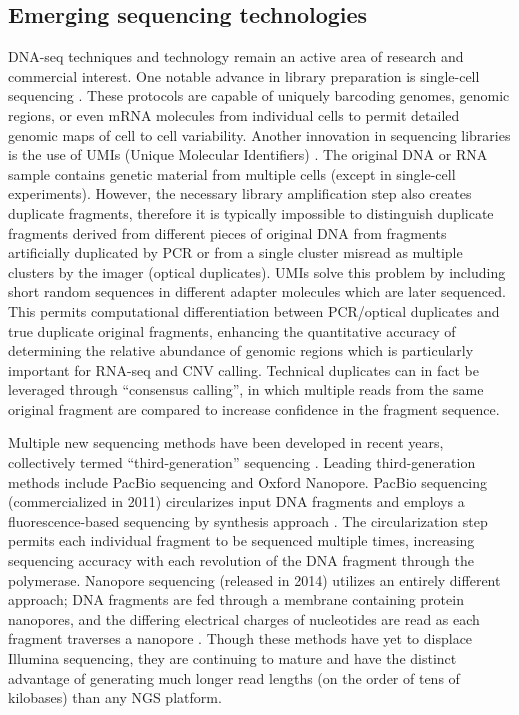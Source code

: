 \subsection{Emerging sequencing technologies}
DNA-seq techniques and technology remain an active area of research and commercial interest. One notable advance in library preparation is single-cell sequencing \cite{navin2011}. These protocols are capable of uniquely barcoding genomes, genomic regions, or even mRNA molecules from individual cells to permit detailed genomic maps of cell to cell variability. Another innovation in sequencing libraries is the use of UMIs (Unique Molecular Identifiers) \cite{kivioja2012}. The original DNA or RNA sample contains genetic material from multiple cells (except in single-cell experiments). However, the necessary library amplification step also creates duplicate fragments, therefore it is typically impossible to distinguish duplicate fragments derived from different pieces of original DNA from fragments artificially duplicated by PCR or from a single cluster misread as multiple clusters by the imager (optical duplicates). UMIs solve this problem by including short random sequences in different adapter molecules which are later sequenced. This permits computational differentiation between PCR\slash{}optical duplicates and true duplicate original fragments, enhancing the quantitative accuracy of determining the relative abundance of genomic regions which is particularly important for RNA-seq and CNV calling. Technical duplicates can in fact be leveraged through ``consensus calling'', in which multiple reads from the same original fragment are compared to increase confidence in the fragment sequence.

Multiple new sequencing methods have been developed in recent years, collectively termed ``third-generation'' sequencing \cite{vandijk2018}. Leading third-generation methods include PacBio sequencing and Oxford Nanopore. PacBio sequencing (commercialized in 2011) circularizes input DNA fragments and employs a fluorescence-based sequencing by synthesis approach \cite{eid2009}. The circularization step permits each individual fragment to be sequenced multiple times, increasing sequencing accuracy with each revolution of the DNA fragment through the polymerase. Nanopore sequencing (released in 2014) utilizes an entirely different approach; DNA fragments are fed through a membrane containing protein nanopores, and the differing electrical charges of nucleotides are read as each fragment traverses a nanopore \cite{jain2015}. Though these methods have yet to displace Illumina sequencing, they are continuing to mature and have the distinct advantage of generating much longer read lengths (on the order of tens of kilobases) than any NGS platform.

